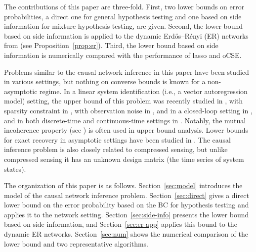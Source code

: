 \documentclass[conference,letterpaper]{IEEEtran}
\begin{document}
The contributions of this paper are three-fold.  First, two lower
bounds on error probabilities, a direct one for general hypothesis
testing and one based on side information for mixture hypothesis
testing, are given.  Second, the lower bound based on side information
is applied to the dynamic Erdős–Rényi (ER) networks from
\cite{SunTaylorBollt15} (see Proposition~\ref{prop:er}).  Third, the
lower bound based on side information is numerically compared with the
performance of lasso and oCSE\cite{SunTaylorBollt15}.

Problems similar to the causal network inference in this paper have
been studied in various settings, but nothing on converse bounds is
known for a non-asymptotic regime.  In a linear system identification
(i.e., a vector autoregression model) setting, the upper bound of this
problem was recently studied in \cite{SimchowitzManiaTu18}, with
sparsity constraint in \cite{FattahiSojoudi18a,FattahiMatniSojoudi19},
with observation noise in \cite{OymakOzay19}, and in a closed-loop
setting in \cite{LaleAzizzadenesheliHassibi20}, and in both
discrete-time and continuous-time settings in
\cite{BentoIbrahimiMontanari10}.  Notably, the mutual incoherence
property (see
\cite{Fuchs05,Tropp06,ZhaoYu06,MeinshausenBuhlmann06,Wainwright09}) is
often used in upper bound analysis.  Lower bounds for exact recovery
in asymptotic settings have been studied in
\cite{JedraProutiere19,BentoIbrahimiMontanari11,PerieraIbrahimi14}.
  The causal inference problem is also
closely related to compressed sensing, but unlike compressed sensing
it has an unknown design matrix (the time series of system states).

The organization of this paper is as follows.  Section~\ref{sec:model}
introduces the model of the causal network inference problem.
Section~\ref{sec:direct} gives a direct lower bound on the error
probability based on the BC for hypothesis testing and applies it to
the network setting.  Section~\ref{sec:side-info} presents the lower
bound based on side information, and Section~\ref{sec:er-app} applies
this bound to the dynamic ER networks.  Section~\ref{sec:num} shows
the numerical comparison of the lower bound and two representative
algorithms.
\end{document}
